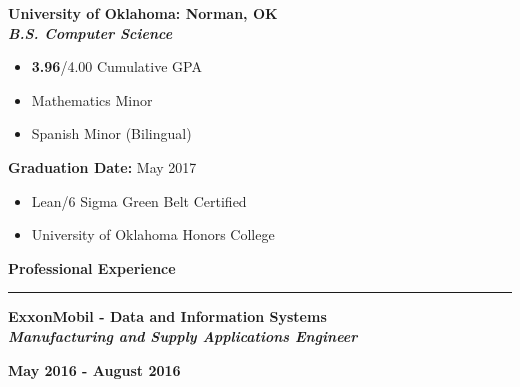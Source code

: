 \documentclass[10pt,letterpaper]{article}
\begin{document}
\begin{minipage}[t]{0.5\textwidth}
        \begin{flushleft}
                \textbf{University of Oklahoma: Norman, OK}\\
                \textbf{\textit{B.S. Computer Science}}

                \begin{itemize}[noitemsep,topsep=0pt]
                        \setlength\itemsep{-0.10em}
                        \item \textbf{3.96}/4.00 Cumulative GPA
                        \item Mathematics Minor
                        \item Spanish Minor (Bilingual)
                \end{itemize}

        \end{flushleft}
\end{minipage}
\begin{minipage}[t]{0.47\textwidth}
        \begin{flushright}
                \textbf{Graduation Date:} May 2017

                \begin{itemize}[noitemsep,topsep=14pt]
                        \item Lean/6 Sigma Green Belt Certified
                        \item University of Oklahoma Honors College
                \end{itemize}

        \end{flushright}
\end{minipage}

\medskip

\begin{large}
        \textbf{Professional Experience}
\end{large}

\smallskip \hrule \smallskip

\begin{minipage}[t]{0.53\textwidth}
        \begin{flushleft}
                \textbf{ExxonMobil - Data and Information Systems}\\
                \textbf{\textit{Manufacturing and Supply Applications Engineer}}\\
        \end{flushleft}
\end{minipage}
\begin{minipage}[t]{0.44\textwidth}
        \begin{flushright}
                \textbf{May 2016 - August 2016}
        \end{flushright}
\end{minipage}
\end{document}
